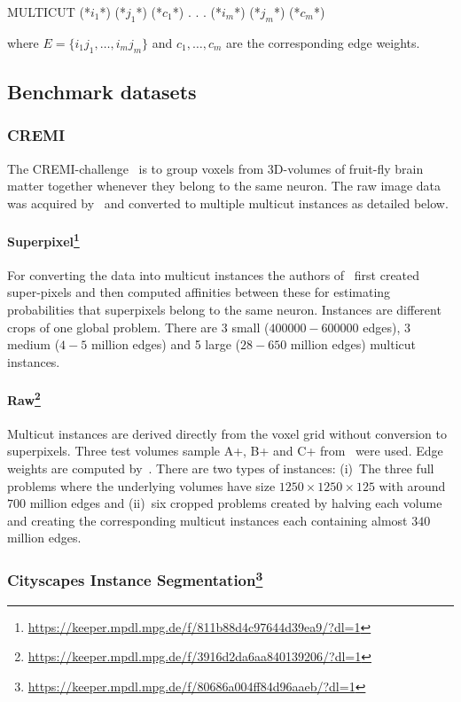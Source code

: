 \begin{fileformat}
MULTICUT
(*$i_1$*) (*$j_1$*) (*$c_1$*)
.
.
.
(*$i_m$*) (*$j_m$*) (*$c_m$*)
\end{fileformat}
where $E = \{i_1 j_1, \ldots, i_m j_m\}$ and $c_1,\ldots,c_m$ are the corresponding edge weights.

\subsection{Benchmark datasets}

\subsubsection{CREMI}
The CREMI-challenge~\cite{cremi} is to group voxels from 3D-volumes of fruit-fly brain matter together whenever they belong to the same neuron.
The raw image data was acquired by~\cite{zheng2018complete} and converted to multiple multicut instances as detailed below.

\paragraph{Superpixel\footnote{\url{https://keeper.mpdl.mpg.de/f/811b88d4c97644d39ea9/?dl=1}}}
For converting the data into multicut instances the authors of~\cite{pape2017solving} first created super-pixels and then computed affinities between these for estimating probabilities that superpixels belong to the same neuron.
Instances are different crops of one global problem.
There are 3 small ($400000-600000$ edges), 3 medium ($4-5$ million edges) and 5 large ($28-650$ million edges) multicut instances.

\paragraph{Raw\footnote{\url{https://keeper.mpdl.mpg.de/f/3916d2da6aa840139206/?dl=1}}}
Multicut instances are derived directly from the voxel grid without conversion to superpixels.
Three test volumes sample A+, B+ and C+ from~\cite{cremi} were used.
Edge weights are computed by~\cite{torch_EM}.
There are two types of instances:
(i)~The three full problems where the underlying volumes have size $1250 \times 1250 \times 125$ with around $700$ million edges and
(ii)~six cropped problems created by halving each volume and creating the corresponding multicut instances each containing almost $340$ million edges.

\subsubsection[Cityscapes Instance Segmentation]{Cityscapes Instance Segmentation\footnote{\url{https://keeper.mpdl.mpg.de/f/80686a004ff84d96aaeb/?dl=1}}}

